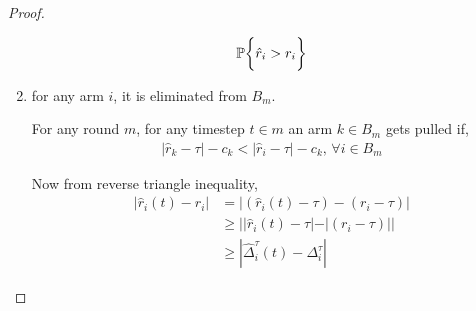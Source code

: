 \begin{proof}
\begin{enumerate}
\begin{align*}
\mathbb{P}\bigg\lbrace \hat{r}_{i} > r_{i}  \bigg\rbrace
\end{align*}

\item for any arm $i$, it is eliminated from $B_{m}$.

	For any round $m$, for any timestep $t\in m$ an arm $k\in B_{m}$ gets pulled if,
\begin{align*}
|\hat{r}_{k} - \tau| - c_{k} < |\hat{r}_{i} - \tau| - c_{k} \text{, } \forall i\in B_{m}
\end{align*}

Now from reverse triangle inequality,
\begin{align*}
|\hat{r}_{i}(t) - r_{i}|&=|(\hat{r}_{i}(t)-\tau) - (r_{i}-\tau)|\\
&\geq ||\hat{r}_{i}(t)-\tau|-|(r_{i}-\tau)||\\
&\geq |\hat{\Delta}_{i}^{\tau}(t) - \Delta_{i}^{\tau}|
\end{align*}



\end{enumerate}



\end{proof}